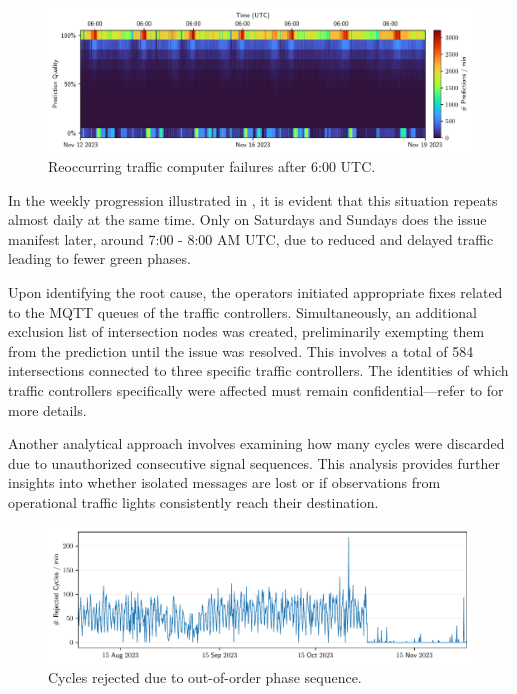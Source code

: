 \begin{figure}[t]
    \centering
    \includegraphics[width=\linewidth]{images/monitoring-7-days.pdf}
    \caption{Reoccurring traffic computer failures after 6:00 UTC.}\label{fig:monitoring-7-days}
\end{figure}

In the weekly progression illustrated in , it is evident that this situation repeats almost daily at the same time. Only on Saturdays and Sundays does the issue manifest later, around 7:00 - 8:00 AM UTC, due to reduced and delayed traffic leading to fewer green phases.

Upon identifying the root cause, the operators initiated appropriate fixes related to the MQTT queues of the traffic controllers. Simultaneously, an additional exclusion list of intersection nodes was created, preliminarily exempting them from the prediction until the issue was resolved. This involves a total of 584 intersections connected to three specific traffic controllers. The identities of which traffic controllers specifically were affected must remain confidential—refer to \cite{neuner_leitfaden_2020} for more details.

Another analytical approach involves examining how many cycles were discarded due to unauthorized consecutive signal sequences. This analysis provides further insights into whether isolated messages are lost or if observations from operational traffic lights consistently reach their destination.

\begin{figure}
    \centering
    \includegraphics[width=\linewidth]{images/monitoring-rejected-cycles.pdf}
    \caption{Cycles rejected due to out-of-order phase sequence.}\label{fig:monitoring-rejected-cycles}
\end{figure}

